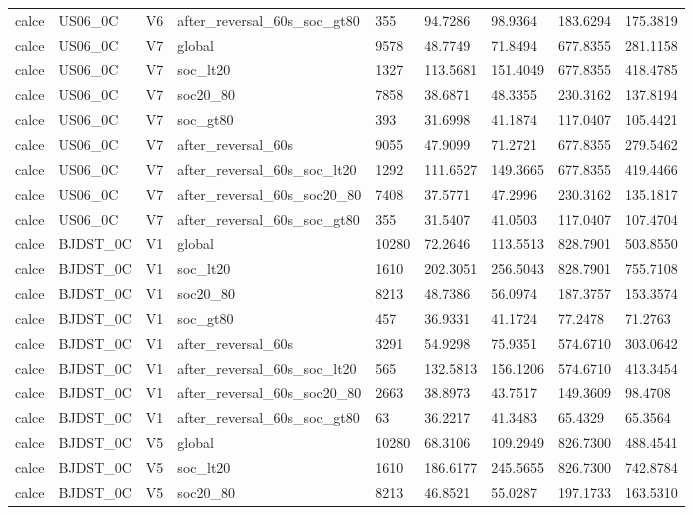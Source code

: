 \begin{tabular}{lllllllll}
calce & US06\_0C & V6 & after\_reversal\_60s\_soc\_gt80 & 355 & 94.7286 & 98.9364 & 183.6294 & 175.3819 \\
calce & US06\_0C & V7 & global & 9578 & 48.7749 & 71.8494 & 677.8355 & 281.1158 \\
calce & US06\_0C & V7 & soc\_lt20 & 1327 & 113.5681 & 151.4049 & 677.8355 & 418.4785 \\
calce & US06\_0C & V7 & soc20\_80 & 7858 & 38.6871 & 48.3355 & 230.3162 & 137.8194 \\
calce & US06\_0C & V7 & soc\_gt80 & 393 & 31.6998 & 41.1874 & 117.0407 & 105.4421 \\
calce & US06\_0C & V7 & after\_reversal\_60s & 9055 & 47.9099 & 71.2721 & 677.8355 & 279.5462 \\
calce & US06\_0C & V7 & after\_reversal\_60s\_soc\_lt20 & 1292 & 111.6527 & 149.3665 & 677.8355 & 419.4466 \\
calce & US06\_0C & V7 & after\_reversal\_60s\_soc20\_80 & 7408 & 37.5771 & 47.2996 & 230.3162 & 135.1817 \\
calce & US06\_0C & V7 & after\_reversal\_60s\_soc\_gt80 & 355 & 31.5407 & 41.0503 & 117.0407 & 107.4704 \\
calce & BJDST\_0C & V1 & global & 10280 & 72.2646 & 113.5513 & 828.7901 & 503.8550 \\
calce & BJDST\_0C & V1 & soc\_lt20 & 1610 & 202.3051 & 256.5043 & 828.7901 & 755.7108 \\
calce & BJDST\_0C & V1 & soc20\_80 & 8213 & 48.7386 & 56.0974 & 187.3757 & 153.3574 \\
calce & BJDST\_0C & V1 & soc\_gt80 & 457 & 36.9331 & 41.1724 & 77.2478 & 71.2763 \\
calce & BJDST\_0C & V1 & after\_reversal\_60s & 3291 & 54.9298 & 75.9351 & 574.6710 & 303.0642 \\
calce & BJDST\_0C & V1 & after\_reversal\_60s\_soc\_lt20 & 565 & 132.5813 & 156.1206 & 574.6710 & 413.3454 \\
calce & BJDST\_0C & V1 & after\_reversal\_60s\_soc20\_80 & 2663 & 38.8973 & 43.7517 & 149.3609 & 98.4708 \\
calce & BJDST\_0C & V1 & after\_reversal\_60s\_soc\_gt80 & 63 & 36.2217 & 41.3483 & 65.4329 & 65.3564 \\
calce & BJDST\_0C & V5 & global & 10280 & 68.3106 & 109.2949 & 826.7300 & 488.4541 \\
calce & BJDST\_0C & V5 & soc\_lt20 & 1610 & 186.6177 & 245.5655 & 826.7300 & 742.8784 \\
calce & BJDST\_0C & V5 & soc20\_80 & 8213 & 46.8521 & 55.0287 & 197.1733 & 163.5310 \\

\end{tabular}
